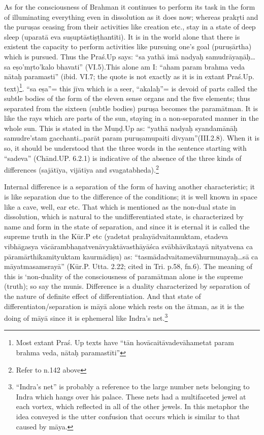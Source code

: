 As for the consciousness of Brahman it continues to perform its task in the form of illuminating everything even in dissolution as it does now; whereas prakṛti and the puruṣas ceasing from their activities like creation etc., stay in a state of deep sleep (uparatā eva suṣuptāstiṣṭhantīti). It is in the world alone that there is existent the capacity to  perform activities like pursuing one’s goal (puruṣārtha)  which is pursued. Thus the Praś.Up says: “sa yathā imā nadyaḥ samudrāyaṇāḥ…sa eṣo’mṛto’kalo bhavati” (VI.5).This alone am I: “aham param brahma veda nātaḥ paramasti” (ibid. VI.7; the quote is not exactly as it is in extant Praś.Up. text)\footnote{Most extant Praś. Up texts have “tān hovācaitāvadevāhametat param brahma veda, nātaḥ paramastīti”}. “sa eṣa”= this jīva which is a  seer, “akalaḥ”= is devoid of parts called the subtle bodies of the form of the eleven sense organs and the five elements; thus separated from the sixteen (subtle bodies) puruṣa becomes the paramātman. It is like the rays which are parts of the sun, staying in a non-separated manner in the whole sun. This is stated in the Muṇḍ.Up as: “yathā nadyaḥ syandamānāḥ samudre’stam gacchanti…parāt param puruṣamupaiti divyam”(III.2.8). When it is so, it should be understood that the three words in the sentence starting with “sadeva” (Chānd.UP. 6.2.1) is indicative of the absence of the three kinds of differences (sajātīya, vijātīya and svagatabheda).\footnote{Refer to n.142 above} 

\vskip -2pt

Internal difference is a separation of the form of having another characteristic; it is like separation due to the difference of the conditions; it is well known in space like a cave, well, ear etc. That which is mentioned as the non-dual state in dissolution, which is natural to the undifferentiated state, is characterized by name and form in the state of separation, and since it is eternal it is called the supreme truth in the Kūr.P etc (yadetat pralayādvaitamuktam, etadeva vibhāgasya vācāram\-bhaṇatvenāvyaktāvasthāyāśca svābhāvikatayā nityatvena ca pāramā\-rthikamityuktam kaurmādiṣu) as: “tasmādadvaitamevāhurmunayaḥ…\-sā ca māyatmasamsrayā” (Kūr.P. Utta. 2.22; cited in Tri. p.58, fn.6).  The meaning of this is ‘non-duality of the consciousness of paramātman alone is the supreme (truth); so say the munis. Difference is a duality characterized by separation of the nature of definite effect of differentiation. And that state of differentiaton/separation is māyā alone which rests on the ātman, as it is the doing of māyā since it is ephemeral like Indra’s net.\footnote{``Indra's net'' is probably a reference to the large number nets belonging to Indra which hangs over his palace. These nets had a multifaceted jewel at each vortex, which reflected in all of the other jewels. In this metaphor the idea conveyed is the utter confusion that occurs which is similar to that caused by māya.} 


